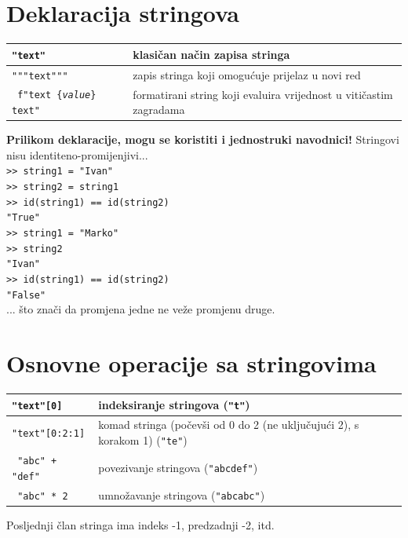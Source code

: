 \documentclass[10pt]{article}
\begin{document}
    \section*{\color{NavyBlue} Deklaracija stringova}
    \begin{tabular}{|>{\tt}p{9.00cm}|>{}p{15.50cm}|}
        \hline
        "text"                                  & klasičan način zapisa stringa                                            \\ \hline
        """text"""                              & zapis stringa koji omogućuje prijelaz u novi red                         \\ \hline
        f"text \{\textit{value}\} text"         & formatirani string koji evaluira vrijednost u vitičastim zagradama       \\ \hline
    \end{tabular}
    \begin{center}
        \footnotesize
        \textbf{Prilikom deklaracije, mogu se koristiti i jednostruki navodnici!}
        Stringovi nisu identiteno-promijenjivi... \\
        \texttt{>> string1 = "Ivan"} \\
        \texttt{>> string2 = string1} \\
        \texttt{>> id(string1) == id(string2)} \\
        \texttt{"True"} \\
        \texttt{>> string1 = "Marko"} \\
        \texttt{>> string2} \\
        \texttt{"Ivan"} \\
        \texttt{>> id(string1) == id(string2)} \\
        \texttt{"False"} \\
        ... što znači da promjena jedne ne veže promjenu druge.
    \end{center}
    
    \section*{\color{NavyBlue} Osnovne operacije sa stringovima}
    \begin{tabular}{|>{\tt}p{9.00cm}|>{}p{15.50cm}|}
        \hline
        "text"[0] & indeksiranje stringova (\texttt{"t"})
        \\ \hline
        "text"[0:2:1] & komad stringa (počevši od 0 do 2 (ne uključujući 2), s korakom 1) (\texttt{"te"})
        \\ \hline
        "abc" + "def" & povezivanje stringova (\texttt{"abcdef"})
        \\ \hline
        "abc" * 2 & umnožavanje stringova (\texttt{"abcabc"})
        \\ \hline
    \end{tabular}
    \begin{center}
        \footnotesize
        Posljednji član stringa ima indeks -1, predzadnji -2, itd.
    \end{center}
\end{document}

